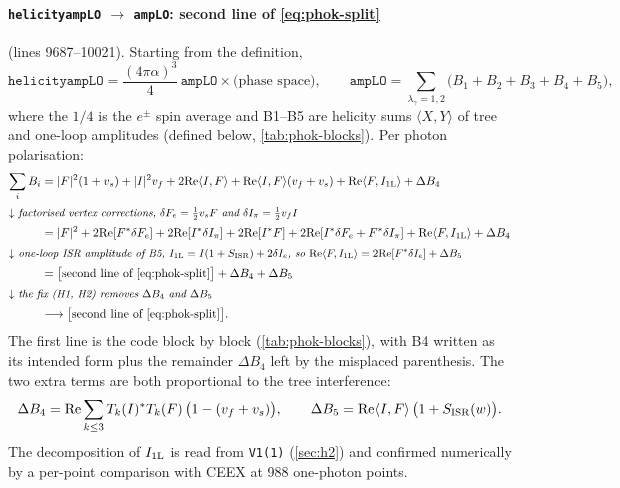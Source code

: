 \documentclass[11pt,a4paper]{article}
\newcommand{\code}[1]{\texttt{#1}}
\newcommand{\ceex}{CEEX}
\begin{document}
\paragraph{\code{helicityampLO} $\to$ \code{ampLO}: second line of \cref{eq:phok-split}}
(lines 9687--10021). Starting from the definition,
\[
  \code{helicityampLO}=\frac{(4\pi\alpha)^3}{4}\,\code{ampLO}\times\text{(phase space)},\qquad
  \code{ampLO}=\sum_{\lambda_\gamma=1,2}\big(B_1+B_2+B_3+B_4+B_5\big),
\]
where the $1/4$ is the $e^\pm$ spin average and B1--B5 are helicity sums
$\langle X,Y\rangle$ of tree and one-loop amplitudes (defined below, \cref{tab:phok-blocks}).
Per photon polarisation:
\begin{align*}
\sum_iB_i
&= |F|^2(1+v_s)+|I|^2v_f+2{\rm Re}\langle I,F\rangle
   +{\rm Re}\langle I,F\rangle(v_f+v_s)+{\rm Re}\langle F,I_{\rm 1L}\rangle+\Delta B_4\\
\intertext{\small\emph{$\downarrow$ factorised vertex corrections, $\delta F_e=\tfrac12v_sF$ and
  $\delta I_\pi=\tfrac12v_fI$}}
&= |F|^2+2{\rm Re}[F^*\delta F_e]+2{\rm Re}[I^*\delta I_\pi]+2{\rm Re}[I^*F]
   +2{\rm Re}[I^*\delta F_e+F^*\delta I_\pi]+{\rm Re}\langle F,I_{\rm 1L}\rangle+\Delta B_4\\
\intertext{\small\emph{$\downarrow$ one-loop ISR amplitude of B5,
  $I_{\rm 1L}=I(1+S_{\rm ISR})+2\delta I_e$, so
  ${\rm Re}\langle F,I_{\rm 1L}\rangle=2{\rm Re}[F^*\delta I_e]+\Delta B_5$}}
&= \big[\text{second line of \cref{eq:phok-split}}\big]+\Delta B_4+\Delta B_5\\
\intertext{\small\emph{$\downarrow$ the fix (H1, H2) removes $\Delta B_4$ and $\Delta B_5$}}
&\longrightarrow \big[\text{second line of \cref{eq:phok-split}}\big].
\end{align*}
The first line is the code block by block (\cref{tab:phok-blocks}), with B4 written as its
intended form plus the remainder $\Delta B_4$ left by the misplaced parenthesis. The two extra
terms are both proportional to the tree interference:
\[
  \Delta B_4={\rm Re}\sum_{k\le3}T_k(I)^*T_k(F)\,\big(1-(v_f+v_s)\big),\qquad
  \Delta B_5={\rm Re}\langle I,F\rangle\,\big(1+S_{\rm ISR}(w)\big).
\]
The decomposition of $I_{\rm 1L}$ is read from \code{V1(1)} (\cref{sec:h2}) and confirmed
numerically by a per-point comparison with \ceex{} at 988 one-photon points.
\end{document}
